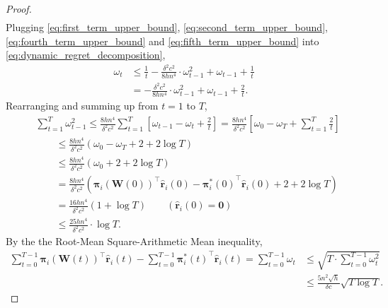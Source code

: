 \documentclass[10pt]{article}
\def\rvr{{\mathbf{r}}}
\def\rvzero{{\mathbf{0}}}
\def\rvpi{{\boldsymbol{\pi}}}
\def\rmW{{\mathbf{W}}}
\begin{document}
\begin{proof}
\begin{equation}
\begin{split}
\end{split}
\end{equation}
Plugging \cref{eq:first_term_upper_bound}, \cref{eq:second_term_upper_bound}, \cref{eq:fourth_term_upper_bound} and \cref{eq:fifth_term_upper_bound} into \cref{eq:dynamic_regret_decomposition},
\begin{equation*}
\begin{split}
    \omega_t &\le \frac{1}{t} - \frac{\delta^2 c^2}{8 h n^4} \cdot \omega_{t-1}^2 + \omega_{t-1} + \frac{1}{t} \\
    &= - \frac{\delta^2 c^2}{8 h n^4} \cdot \omega_{t-1}^2 + \omega_{t-1} + \frac{2}{t}.
\end{split}
\end{equation*}
Rearranging and summing up from $t = 1$ to $T$,
\begin{equation*}
\begin{split}
    &\sum\limits_{t=1}^{T}{ \omega_{t-1}^2 } \le \frac{8 h n^4}{\delta^2 c^2} \sum\limits_{t=1}^{T}{\left[ \omega_{t-1} - \omega_t + \frac{2}{t} \right]} = \frac{8 h n^4}{\delta^2 c^2} \left[ \omega_0 - \omega_T + \sum\limits_{t=1}^{T}{\frac{2}{t}} \right] \\
    &\qquad \le \frac{8 h n^4}{\delta^2 c^2} \left( \omega_0 - \omega_T + 2 + 2 \log{T} \right) \\
    &\qquad \le \frac{8 h n^4}{\delta^2 c^2} \left( \omega_0 + 2 + 2 \log{T} \right) \\
    &\qquad = \frac{8 h n^4}{\delta^2 c^2} \left( \rvpi_i\left(\rmW(0)\right)^\top \hat{\rvr}_i(0) - {\rvpi_i^*(0)}^\top \hat{\rvr}_i(0) + 2 + 2 \log{T} \right) \\
    &\qquad = \frac{16 h n^4}{\delta^2 c^2} \left( 1 + \log{T} \right) \qquad \left( \hat{\rvr}_i(0) = \rvzero \right) \\
    &\qquad \le \frac{25 h n^4}{\delta^2 c^2} \cdot \log{T}.
\end{split}
\end{equation*}
By the the Root-Mean Square-Arithmetic Mean inequality,
\begin{equation}
\label{eq:dynamic_regret_upper_bound}
\begin{split}
    \sum\limits_{t=0}^{T-1}{ \rvpi_i\left(\rmW(t)\right)^\top \hat{\rvr}_i(t)} - \sum\limits_{t=0}^{T-1}{ {\rvpi_i^*(t)}^\top \hat{\rvr}_i(t)} = \sum\limits_{t=0}^{T-1}{ \omega_t } &\le \sqrt{ T \cdot \sum\limits_{t=0}^{T-1}{ \omega_{t}^2 } } \\
    &\le \frac{5 n^2 \sqrt{h}}{\delta c}\sqrt{T \log{T}}.
\end{split}

\end{equation}
\end{proof}
\end{document}
